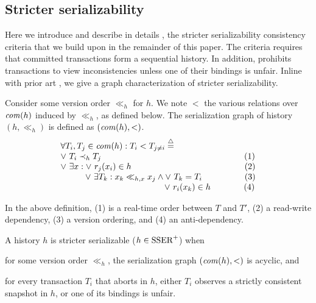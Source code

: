 \subsection{Stricter serializability}
Here we introduce and describe in details \sser, the stricter serializability consistency criteria that we build upon in the remainder of this paper.
The \sser criteria requires that committed transactions form a sequential history.
In addition, \sser prohibits transactions to view inconsistencies unless one of their bindings is unfair.
Inline with prior art \cite{berstein,opa}, we give a graph characterization of stricter serializability.

\begin{definition}
  Consider some version order $\ll_h$ for $h$.
  We note $<$ the various relations over $\committed{h}$ induced by $\ll_h$, as defined below.
  The serialization graph of history $(h,\ll_h)$ is defined as $(\committed{h},<)$.
  \begin{displaymath}
    \begin{array}{l}
      \forall T_i, T_j \in \committed{h} : 
      T_i < T_{j \neq i}  \equaldef \\
      \lor~ T_i \hb_h T_j {\hspace{16.8em}\text{(1)}} \\
      \lor~ \exists x : \lor~ r_j(x_i) \in h {\hspace{13.3em}\text{(2)}} \\
      \hspace{2.9em}\lor~ \exists T_k : x_k \ll_{h,x} x_j \land \lor~T_k = T_i {\hspace{5em}\text{(3)}} \\
      \hspace{12.2em} \lor~ r_i(x_k) \in h {\hspace{3.9em}\text{(4)}}
    \end{array}
  \end{displaymath}  
\end{definition}
In the above definition, (1) is a real-time order between $T$ and $T'$, (2) a read-write dependency, (3) a version ordering, and (4) an anti-dependency.

\begin{definition}
  A history $h$ is stricter serializable ($h \in \SPSER$) when
  \begin{inparaenum}
  \item for some version order $\ll_h$, the serialization graph $(\committed{h},<)$ is acyclic, and
  \item for every transaction $T_i$ that aborts in $h$, either $T_i$ observes a strictly consistent snapshot in $h$, or one of its bindings is unfair.
  \end{inparaenum}
\end{definition}

